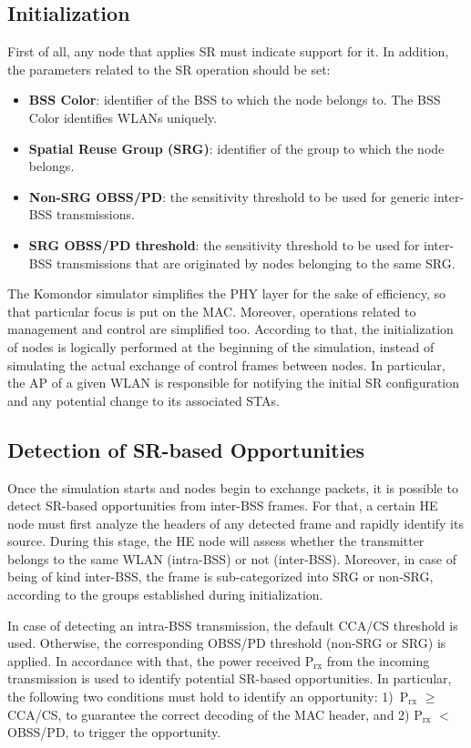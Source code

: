\documentclass[conference]{IEEEtran}
\begin{document}
	\subsection{Initialization}
	First of all, any node that applies SR must indicate support for it. In addition, the parameters related to the SR operation should be set:
	\begin{itemize}
		\item \textbf{BSS Color}: identifier of the BSS to which the node belongs to. The BSS Color identifies WLANs uniquely.
		\item \textbf{Spatial Reuse Group (SRG)}: identifier of the group to which the node belongs.
		\item \textbf{Non-SRG OBSS/PD}: the sensitivity threshold to be used for generic inter-BSS transmissions.
		\item \textbf{SRG OBSS/PD threshold}: the sensitivity threshold to be used for inter-BSS transmissions that are originated by nodes belonging to the same SRG.
	\end{itemize}
	
	The Komondor simulator simplifies the PHY layer for the sake of efficiency, so that particular focus is put on the MAC. Moreover, operations related to management and control are simplified too. According to that, the initialization of nodes is logically performed at the beginning of the simulation, instead of simulating the actual exchange of control frames between nodes. In particular, the AP of a given WLAN is responsible for notifying the initial SR configuration and any potential change to its associated STAs.

	\subsection{Detection of SR-based Opportunities}
	
	Once the simulation starts and nodes begin to exchange packets, it is possible to detect SR-based opportunities from inter-BSS frames. For that, a certain HE node must first analyze the headers of any detected frame and rapidly identify its source. During this stage, the HE node will assess whether the transmitter belongs to the same WLAN (intra-BSS) or not (inter-BSS). Moreover, in case of being of kind inter-BSS, the frame is sub-categorized into SRG or non-SRG, according to the groups established during initialization.
	
	In case of detecting an intra-BSS transmission, the default CCA/CS threshold is used. Otherwise, the corresponding OBSS/PD threshold (non-SRG or SRG) is applied. In accordance with that, the power received P$_\text{rx}$ from the incoming transmission is used to identify potential SR-based opportunities. In particular, the following two conditions must hold to identify an opportunity: 1)~P$_\text{rx}$ $\geq$ CCA/CS, to guarantee the correct decoding of the MAC header, and 2) P$_\text{rx}$ $<$ OBSS/PD, to trigger the opportunity.
	
\end{document}
